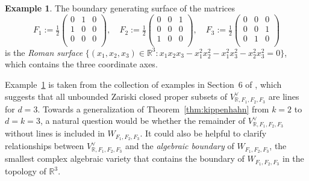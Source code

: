 \documentclass[12pt]{amsart}
\theoremstyle{definition}
\newtheorem{exa}[thm]{Example}
\numberwithin{equation}{section}
\begin{document}
\begin{exa}\label{exa:roman}
The boundary generating surface of the matrices 
\[
F_1:=\tfrac{1}{2}
\left(\begin{smallmatrix}
 0 & 1 & 0 \\
 1 & 0 & 0 \\
 0 & 0 & 0 \\
\end{smallmatrix}\right),
\quad
F_2:=\tfrac{1}{2}
\left(\begin{smallmatrix}
 0 & 0 & 1\\
 0 & 0 & 0\\
 1 & 0 & 0 \\
\end{smallmatrix}\right),
\quad
F_3:=\tfrac{1}{2}
\left(\begin{smallmatrix}
 0 & 0 & 0 \\
 0 & 0 & 1 \\
 0 & 1 & 0 \\
\end{smallmatrix}\right)
\] 
is the {\em Roman surface} 
$\{(x_1,x_2,x_3)\in{\mathbb R}^3:x_1 x_2 x_3 - x_1^2 x_2^2 - x_1^2 x_3^2 - x_2^2 x_3^2=0\}$,
which contains the three coordinate axes. 
\end{exa}
\par
Example~\ref{exa:roman} is taken from the collection of examples in 
Section~6 of \cite{Szymanski-etal2016}, which suggests that all unbounded 
Zariski closed proper subsets of $V^\vee_{{\mathbb R},F_1,F_2,F_3}$ are lines for 
$d=3$. Towards a generalization of Theorem~\ref{thm:kippenhahn} from 
$k=2$ to $d=k=3$, a natural question would be whether the remainder 
of $V^\vee_{{\mathbb R},F_1,F_2,F_3}$ without lines is included in 
$W_{F_1,F_2,F_3}$. It could also be helpful to clarify relationships 
between $V^\vee_{{\mathbb R},F_1,F_2,F_3}$ and the {\em algebraic boundary} 
\cite{RostalskiSturmfels2013,SinnSturmfels2015} of $W_{F_1,F_2,F_3}$, 
the smallest complex algebraic variety that contains the boundary of 
$W_{F_1,F_2,F_3}$ in the topology of ${\mathbb R}^3$. 
\end{document}
